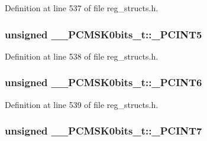 Definition at line 537 of file reg\+\_\+structs.\+h.

\hypertarget{union_____p_c_m_s_k0bits__t_a56d89760d15b21dd0e098c19b4dc8916}{
\subsubsection[{\+\_\+\+P\+C\+I\+N\+T5}]{\setlength{\rightskip}{0pt plus 5cm}unsigned \+\_\+\+\_\+\+P\+C\+M\+S\+K0bits\+\_\+t\+::\+\_\+\+P\+C\+I\+N\+T5}}\label{union_____p_c_m_s_k0bits__t_a56d89760d15b21dd0e098c19b4dc8916}


Definition at line 538 of file reg\+\_\+structs.\+h.

\hypertarget{union_____p_c_m_s_k0bits__t_a7f3ed66de68e3fd0b7dc7f19ab7c3565}{
\subsubsection[{\+\_\+\+P\+C\+I\+N\+T6}]{\setlength{\rightskip}{0pt plus 5cm}unsigned \+\_\+\+\_\+\+P\+C\+M\+S\+K0bits\+\_\+t\+::\+\_\+\+P\+C\+I\+N\+T6}}\label{union_____p_c_m_s_k0bits__t_a7f3ed66de68e3fd0b7dc7f19ab7c3565}


Definition at line 539 of file reg\+\_\+structs.\+h.

\hypertarget{union_____p_c_m_s_k0bits__t_ac895fc43c5e5d26b106c816161738358}{
\subsubsection[{\+\_\+\+P\+C\+I\+N\+T7}]{\setlength{\rightskip}{0pt plus 5cm}unsigned \+\_\+\+\_\+\+P\+C\+M\+S\+K0bits\+\_\+t\+::\+\_\+\+P\+C\+I\+N\+T7}}\label{union_____p_c_m_s_k0bits__t_ac895fc43c5e5d26b106c816161738358}


